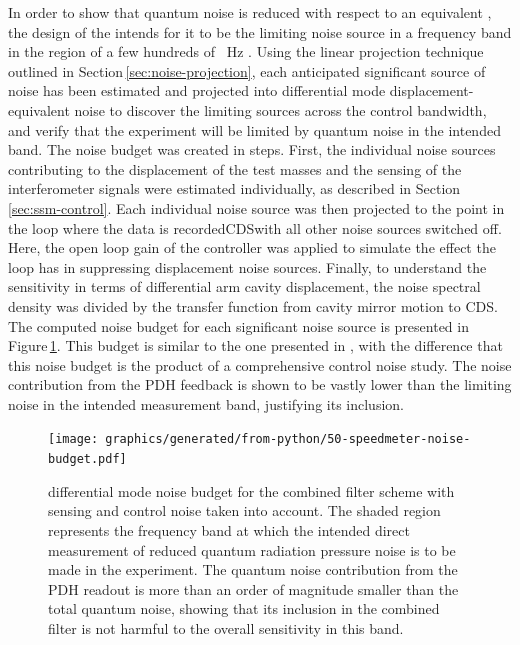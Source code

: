 In order to show that quantum noise is reduced with respect to an equivalent \MI{}, the design of the \SSMEXPT{} intends for it to be the limiting noise source in a frequency band in the region of a few hundreds of \SI{}{\hertz} \cite{Graef2014}. Using the linear projection technique outlined in Section\,\ref{sec:noise-projection}, each anticipated significant source of noise has been estimated and projected into differential mode displacement-equivalent noise to discover the limiting sources across the control bandwidth, and verify that the experiment will be limited by quantum noise in the intended band. The noise budget was created in steps. First, the individual noise sources contributing to the displacement of the test masses and the sensing of the interferometer signals were estimated individually, as described in Section\,\ref{sec:ssm-control}. Each individual noise source was then projected to the point in the loop where the data is recorded\textemdash \gls{CDS}\textemdash with all other noise sources switched off. Here, the open loop gain of the controller was applied to simulate the effect the loop has in suppressing displacement noise sources. Finally, to understand the sensitivity in terms of differential arm cavity displacement, the noise spectral density was divided by the transfer function from cavity mirror motion to \gls{CDS}. The computed noise budget for each significant noise source is presented in Figure\,\ref{fig:noise-budget}. This budget is similar to the one presented in \cite{Graef2014}, with the difference that this noise budget is the product of a comprehensive control noise study. The noise contribution from the \gls{PDH} feedback is shown to be vastly lower than the limiting noise in the intended measurement band, justifying its inclusion.

\begin{figure}
  \texttt{[image: graphics/generated/from-python/50-speedmeter-noise-budget.pdf]}
  \caption[Control noise budget for the \SSMEXPT{}]{\label{fig:noise-budget}\SSM{} differential mode noise budget for the combined filter scheme with sensing and control noise taken into account. The shaded region represents the frequency band at which the intended direct measurement of reduced quantum radiation pressure noise is to be made in the experiment. The quantum noise contribution from the PDH readout is more than an order of magnitude smaller than the total quantum noise, showing that its inclusion in the combined filter is not harmful to the overall sensitivity in this band.}
\end{figure}

